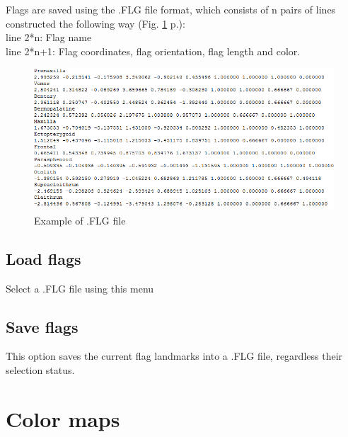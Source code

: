\noindent
Flags are saved using the .FLG file format, which consists of n pairs of lines constructed the following way (Fig. \ref{FLG_file} p.\pageref{FLG_file}):\\
line 2*n: Flag name\\
line 2*n+1: Flag coordinates, flag orientation, flag length and color.

\begin{figure}
  \centering
  \includegraphics[scale=0.5]{images/07/flags/FLG_file.png}
 \caption{Example of .FLG file}
\label{FLG_file}
\end{figure}

\subsection{Load flags}
Select a .FLG file using this menu

\subsection{Save flags}
This option saves the current flag landmarks into a .FLG file, regardless their selection status.


\section{Color maps}


